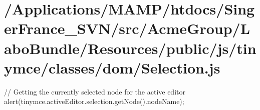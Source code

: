 \hypertarget{_2_applications_2_m_a_m_p_2htdocs_2_singer_france__s_v_n_2src_2_acme_group_2_labo_bundle_2_resou9d39e4087be78c99ac0f560b1349414a}{\section{/\+Applications/\+M\+A\+M\+P/htdocs/\+Singer\+France\+\_\+\+S\+V\+N/src/\+Acme\+Group/\+Labo\+Bundle/\+Resources/public/js/tinymce/classes/dom/\+Selection.\+js}
}
// Getting the currently selected node for the active editor alert(tinymce.\+active\+Editor.\+selection.\+get\+Node().node\+Name);


\begin{DoxyCodeInclude}
\end{DoxyCodeInclude}
 
